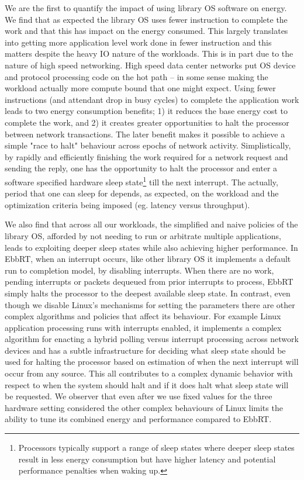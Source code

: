 We are the first to quantify the impact of using library OS software on energy.  We find that as expected the library OS uses fewer instruction to complete the work and that this has impact on the energy consumed.  This largely translates into getting more application level work done in fewer instruction and this matters despite the heavy IO nature of the workloads.  This is in part due to the nature of high speed networking.  High speed data center networks put OS device and protocol processing code on the hot path -- in some sense making the workload actually more compute bound that one might expect.  Using fewer instructions (and attendant drop in busy cycles) to complete the application work leads to two energy consumption benefits; 1) it reduces the base energy cost to complete the work, and 2) it creates greater opportunities to halt the processor between network transactions.  The later benefit makes it possible to achieve a simple "race to halt" behaviour across epochs of network activity.  
Simplistically, by rapidly and efficiently finishing the work required for a network request and sending the reply, one has the opportunity to halt the processor and enter a software specified hardware sleep state\footnote{Processors typically support a range of sleep states where deeper sleep states result in less energy consumption but have higher latency and potential performance penalties when waking up.} till the next interrupt.  The actually, period that one can sleep for depends, as expected, on the workload and the optimization criteria being imposed (eg. latency versus throughput).   

We also find that across all our workloads, the simplified and naive policies of the library OS, afforded by not needing to run or arbitrate multiple applications, leads to exploiting deeper sleep states while also achieving higher performance.  In EbbRT, when an interrupt occurs, like other library OS it implements a default run to completion model, by disabling interrupts.  When there are no work,  pending interrupts or packets dequeued from prior interrupts to process, EbbRT simply halts the processor to the deepest available sleep state. In contrast, even though we disable Linux's mechanisms for setting the parameters there are other complex algorithms and policies that affect its behaviour.  For example Linux application processing runs with interrupts enabled, it implements a complex algorithm for enacting a hybrid polling versus interrupt processing across network devices and has a subtle infrastructure for deciding what sleep state should be used for halting the processor based on estimation of when the next interrupt will occur from any source.  This all contributes to a complex dynamic behavior with respect to when the system should halt and if it does halt what sleep state will be requested.  We observer that even after we use fixed values for the three  hardware setting considered the other complex behaviours of Linux limits the ability to tune its combined energy and performance compared to EbbRT.


